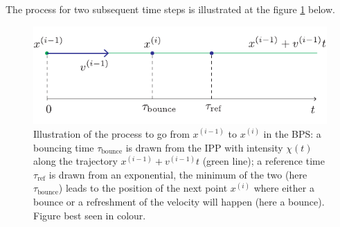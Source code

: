 The process for two subsequent time steps is illustrated at the figure \ref{fig:bps-trajec} below.
\begin{figure}[!h]
\center
	\includegraphics[width=.8\textwidth]{./figures/extra/trajec-bps}
	\caption{\label{fig:bps-trajec} Illustration of the process to go from $x^{(i-1)}$ to $x^{(i)}$ in the BPS: a bouncing time $\tau_{\text{bounce}}$ is drawn from the IPP with intensity $\chi(t)$ along the trajectory $x^{(i-1)}+v^{(i-1)}t$ (green line); a reference time $\tau_{\text{ref}}$ is drawn from an exponential, the minimum of the two (here $\tau_{\text{bounce}}$) leads to the position of the next point $x^{(i)}$ where either a bounce or a refreshment of the velocity will happen (here a bounce). Figure best seen in colour.}
\end{figure}


